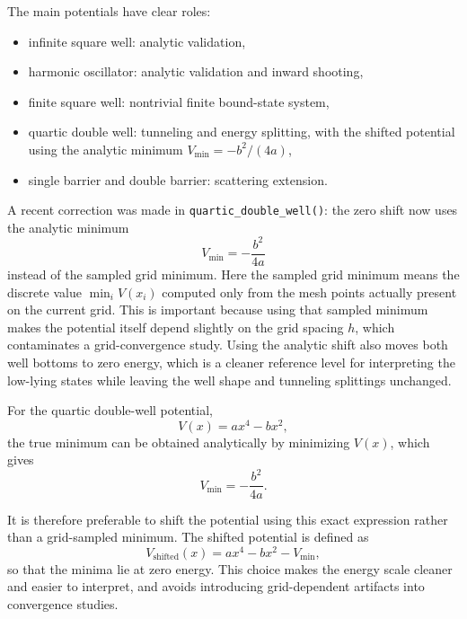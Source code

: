 \documentclass[11pt]{article}
\begin{document}
    The main potentials have clear roles:
    \begin{itemize}
        \item infinite square well: analytic validation,
        \item harmonic oscillator: analytic validation and inward shooting,
        \item finite square well: nontrivial finite bound-state system,
        \item quartic double well: tunneling and energy splitting, with the shifted potential using the analytic minimum $V_{\min}=-b^2/(4a)$,
        \item single barrier and double barrier: scattering extension.
    \end{itemize}


    A recent correction was made in \texttt{quartic\_double\_well()}: the zero shift now uses the analytic minimum
    \begin{equation}
        V_{\min}=-\frac{b^2}{4a}
    \end{equation}
    instead of the sampled grid minimum. Here the sampled grid minimum means the discrete value $\min_i V(x_i)$ computed only from the mesh points actually present on the current grid. This is important because using that sampled minimum makes the potential itself depend slightly on the grid spacing $h$, which contaminates a grid-convergence study. Using the analytic shift also moves both well bottoms to zero energy, which is a cleaner reference level for interpreting the low-lying states while leaving the well shape and tunneling splittings unchanged.

    For the quartic double-well potential,
    \begin{equation}
        V(x)=a x^4 - b x^2,
    \end{equation}
    the true minimum can be obtained analytically by minimizing $V(x)$, which gives
    \begin{equation}
        V_{\min} = -\frac{b^2}{4a}.
    \end{equation}

    It is therefore preferable to shift the potential using this exact expression rather than a grid-sampled minimum. The shifted potential is defined as
    \begin{equation}
        V_{\text{shifted}}(x) = a x^4 - b x^2 - V_{\min},
    \end{equation}
    so that the minima lie at zero energy. This choice makes the energy scale cleaner and easier to interpret, and avoids introducing grid-dependent artifacts into convergence studies.
\end{document}
